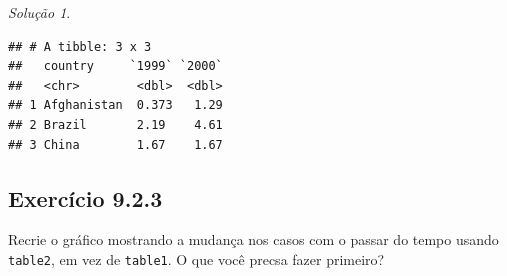 \documentclass[
]{latex/krantz}
\newenvironment{Shaded}{\begin{snugshade}}{\end{snugshade}}
\newcommand{\AttributeTok}[1]{\textcolor[rgb]{0.13,0.29,0.53}{#1}}
\newcommand{\DecValTok}[1]{\textcolor[rgb]{0.00,0.00,0.81}{#1}}
\newcommand{\FunctionTok}[1]{\textcolor[rgb]{0.13,0.29,0.53}{\textbf{#1}}}
\newcommand{\NormalTok}[1]{#1}
\newcommand{\OtherTok}[1]{\textcolor[rgb]{0.56,0.35,0.01}{#1}}
\newcommand{\SpecialCharTok}[1]{\textcolor[rgb]{0.81,0.36,0.00}{\textbf{#1}}}
\newcommand{\StringTok}[1]{\textcolor[rgb]{0.31,0.60,0.02}{#1}}
\theoremstyle{definition}
\theoremstyle{definition}
\theoremstyle{definition}
\theoremstyle{definition}
\theoremstyle{remark}
\newtheorem*{solution}{Solução}
\begin{document}
\begin{solution}
\begin{Shaded}
\end{Shaded}

\begin{verbatim}
## # A tibble: 3 x 3
##   country     `1999` `2000`
##   <chr>        <dbl>  <dbl>
## 1 Afghanistan  0.373   1.29
## 2 Brazil       2.19    4.61
## 3 China        1.67    1.67
\end{verbatim}

\end{solution}

\hypertarget{exr9-2-3}{%
\subsection*{Exercício 9.2.3}\label{exr9-2-3}}

Recrie o gráfico mostrando a mudança nos casos com o passar do tempo usando \texttt{table2}, em vez de \texttt{table1}. O que você precsa fazer primeiro?
\end{document}
